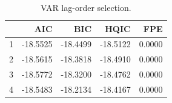 \begin{table}[H]
\centering
\caption{VAR lag-order selection.}
\label{tab:lag_selection}
\begin{tabular}{lrrrr}
\toprule
 & AIC & BIC & HQIC & FPE \\
\midrule
1 & -18.5525 & -18.4499 & -18.5122 & 0.0000 \\
2 & -18.5615 & -18.3818 & -18.4910 & 0.0000 \\
3 & -18.5772 & -18.3200 & -18.4762 & 0.0000 \\
4 & -18.5483 & -18.2134 & -18.4167 & 0.0000 \\
\bottomrule
\end{tabular}
\end{table}